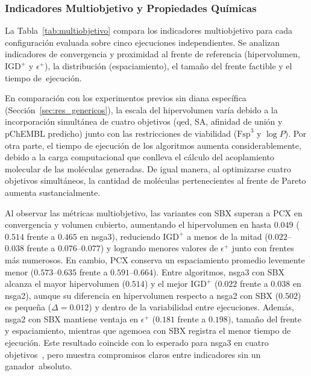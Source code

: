 \subsubsection{Indicadores Multiobjetivo y Propiedades Químicas}
\label{subsubsec:indicadores_multiobjetivo_quimicos}

La Tabla~\ref{tab:multiobjetivo} compara los indicadores multiobjetivo para cada configuración evaluada sobre cinco ejecuciones independientes. Se analizan indicadores de convergencia y proximidad al frente de referencia (hipervolumen, $\text{IGD}^+$ y $\epsilon^+$), la distribución (espaciamiento), el tamaño del frente factible y el tiempo de~ejecución.



En comparación con los experimentos previos sin diana específica (Sección~\ref{sec:res_genericos}), la escala del hipervolumen varía debido a la incorporación simultánea de cuatro objetivos (\gls{qed}, SA, afinidad de unión y pChEMBL predicho) junto con las restricciones de viabilidad ($\text{Fsp}^3$ y $\log P$). Por otra parte, el tiempo de ejecución de los algoritmos aumenta considerablemente, debido a la carga computacional que conlleva el cálculo del acoplamiento molecular de las moléculas generadas. De igual manera, al optimizarse cuatro objetivos simultáneos, la cantidad de moléculas pertenecientes al frente de Pareto aumenta sustancialmente.

Al observar las métricas multiobjetivo, las variantes con SBX superan a PCX en convergencia y volumen cubierto, aumentando el hipervolumen en hasta $0.049$ ($0.514$ frente a $0.465$ en \acrshort{nsga3}), reduciendo $\text{IGD}^+$ a menos de la mitad ($0.022$--$0.038$ frente a $0.076$--$0.077$) y logrando menores valores de $\epsilon^+$ junto con frentes más numerosos. En cambio, PCX conserva un espaciamiento promedio levemente menor ($0.573$--$0.635$ frente a $0.591$--$0.664$). Entre algoritmos, \acrshort{nsga3} con SBX alcanza el mayor hipervolumen ($0.514$) y el mejor $\text{IGD}^+$ ($0.022$ frente a $0.038$ en \acrshort{nsga2}), aunque su diferencia en hipervolumen respecto a \acrshort{nsga2} con SBX ($0.502$) es pequeña ($\Delta = 0.012$) y dentro de la variabilidad entre ejecuciones. Además, \acrshort{nsga2} con SBX mantiene ventaja en $\epsilon^+$ ($0.181$ frente a $0.198$), tamaño del frente y espaciamiento, mientras que \acrshort{agemoea} con SBX registra el menor tiempo de ejecución. Este resultado coincide con lo esperado para \acrshort{nsga3} en cuatro objetivos~\cite{deb2014nsga3}, pero muestra compromisos claros entre indicadores sin un ganador~absoluto.


